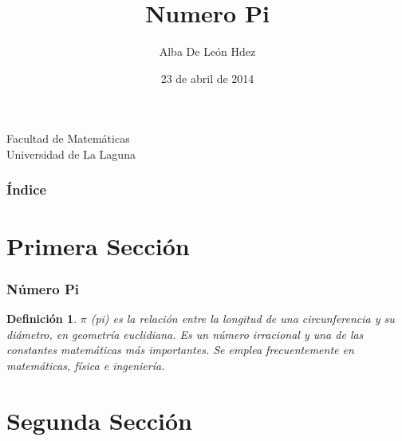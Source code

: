 \documentclass{beamer}
\newtheorem{definicion}{Definición}
\begin{document}
\title[Presentación con Beamer]{Numero Pi }
\author[Alba De León Hdez]{Alba De León Hdez}
\date[23-04-2014]{23 de abril de 2014}





  
\begin{frame}
  \titlepage
  \begin{small}
    \begin{center}
     Facultad de Matemáticas \\
     Universidad de La Laguna
    \end{center}
  \end{small}

\end{frame}

\begin{frame}
  \frametitle{Índice}
  \tableofcontents[pausesections]
\end{frame}


\section{Primera Sección}


\begin{frame}

\frametitle{Número Pi}

\begin{definicion}
$\pi$ (pi) es la relación entre la longitud de una circunferencia y su diámetro, en geometría euclidiana. 
Es un número irracional y una de las constantes matemáticas más importantes. 
Se emplea frecuentemente en matemáticas, física e ingeniería. 

\end{definicion}

\end{frame}

\section{Segunda Sección}
\end{document}
